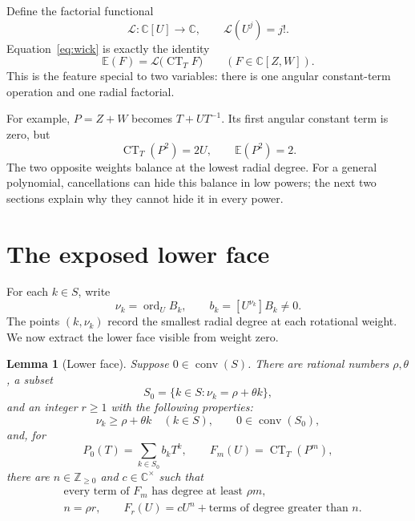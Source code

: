 \documentclass[11pt]{article}
\newtheorem{lemma}[theorem]{Lemma}
\newcommand{\C}{\mathbb C}
\newcommand{\Z}{\mathbb Z}
\newcommand{\E}{\mathbb E}
\newcommand{\CT}{\operatorname{CT}}
\newcommand{\ord}{\operatorname{ord}}
\newcommand{\conv}{\operatorname{conv}}
\begin{document}
Define the factorial functional
\[
  \mathcal L:\C[U]\longrightarrow\C,\qquad
  \mathcal L(U^j)=j!.
\]
Equation~\eqref{eq:wick} is exactly the identity
\begin{equation}\label{eq:expectation-factorization}
  \E(F)=\mathcal L\bigl(\CT_T F\bigr)
  \qquad(F\in\C[Z,W]).
\end{equation}
This is the feature special to two variables: there is one angular
constant-term operation and one radial factorial.

For example, \(P=Z+W\) becomes \(T+UT^{-1}\).  Its first angular
constant term is zero, but
\[
  \CT_T(P^2)=2U,\qquad \E(P^2)=2.
\]
The two opposite weights balance at the lowest radial degree.  For a
general polynomial, cancellations can hide this balance in low powers;
the next two sections explain why they cannot hide it in every power.

\section{The exposed lower face}

For each \(k\in S\), write
\[
  \nu_k=\ord_U B_k,\qquad
  b_k=[U^{\nu_k}]B_k\neq0.
\]
The points \((k,\nu_k)\) record the smallest radial degree at each
rotational weight.  We now extract the lower face visible from weight zero.

\begin{lemma}[Lower face]\label{lem:face}
Suppose \(0\in\conv(S)\).  There are rational numbers \(\rho,\theta\), a
subset
\[
  S_0=\{k\in S:\nu_k=\rho+\theta k\},
\]
and an integer \(r\geq1\) with the following properties:
\[
  \nu_k\geq\rho+\theta k\quad(k\in S),\qquad
  0\in\conv(S_0),
\]
and, for
\[
  P_0(T)=\sum_{k\in S_0}b_kT^k,\qquad
  F_m(U)=\CT_T(P^m),
\]
there are \(n\in\Z_{\geq0}\) and \(c\in\C^\times\) such that
\begin{align}
  &\text{every term of }F_m\text{ has degree at least }\rho m,
       \label{eq:global-bound}\\
  &n=\rho r,\qquad F_r(U)=cU^n+\text{terms of degree greater than }n.
       \label{eq:leading}
\end{align}
\end{lemma}
\end{document}
